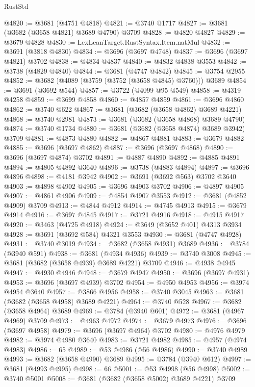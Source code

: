 \begin{lexlean}{RustStd}
\begin{coremodule}
@4820 := @3681 (@4751 @4818)
@4821 := @3740 @1717
@4827 := @3681 (@3682 (@3658 @4821) @3689 @4790) @3709
@4828 := @4820 @4827
@4829 := @3679 @4828
@4830 := LexLeanTarget.RustSyntax.Item.natMul
@4832 := @3691 (@3818 @4830)
@4834 := @3696 (@3697 @4748)
@4837 := @3696 (@3697 @4821) @3702
@4838 := @4834 @4837
@4840 := @4832 @4838 @3553
@4842 := @3738 (@4829 @4840)
@4844 := @3681 (@4747 @4842)
@4845 := @3754 @2955
@4852 := @3682 (@4089 (@3759 (@3752 (@3658 @4845) @3760))) @3689
@4854 := @3691 (@3692 @544)
@4857 := @3722 (@4099 @95 @549)
@4858 := @4319 @4258
@4859 := @3699 @4858
@4860 := @4857 @4859
@4861 := @3696 @4860
@4862 := @3740 @622
@4867 := @3681 (@3682 (@3658 @4862) @3689 @4221)
@4868 := @3740 @2981
@4873 := @3681 (@3682 (@3658 @4868) @3689 @4790)
@4874 := @3740 @1734
@4880 := @3681 (@3682 (@3658 @4874) @3689 @3942) @3709
@4881 := @4873 @4880
@4882 := @4867 @4881
@4883 := @3679 @4882
@4885 := @3696 (@3697 @4862)
@4887 := @3696 (@3697 @4868)
@4890 := @3696 (@3697 @4874) @3702
@4891 := @4887 @4890
@4892 := @4885 @4891
@4894 := @4805 @4892 @3640
@4896 := @3738 (@4883 @4894)
@4897 := @3696 @4896
@4898 := @4181 @3942
@4902 := @3691 (@3692 @563) @3702 @3640
@4903 := @4898 @4902
@4905 := @3696 @4903 @3702
@4906 := @4897 @4905
@4907 := @4861 @4906
@4909 := @4854 @4907 @3553
@4912 := @3681 (@4852 @4909) @3709
@4913 := @4844 @4912
@4914 := @4745 @4913
@4915 := @3679 @4914
@4916 := @3697 @4845
@4917 := @3721 @4916
@4918 := @4915 @4917
@4920 := @3463 (@4725 @4918)
@4924 := @3649 (@3652 @401) @4313 @3934
@4928 := @3691 (@3692 @584) @4321 @3553
@4930 := @3681 (@4747 @4928)
@4931 := @3740 @3019
@4934 := @3682 (@3658 @4931) @3689
@4936 := @3784 (@3940 @591)
@4938 := @3681 (@4934 @4936)
@4939 := @3740 @3008
@4945 := @3681 (@3682 (@3658 @4939) @3689 @4221) @3709
@4946 := @4938 @4945
@4947 := @4930 @4946
@4948 := @3679 @4947
@4950 := @3696 (@3697 @4931)
@4953 := @3696 (@3697 @4939) @3702
@4954 := @4950 @4953
@4956 := @3974 @4954 @3640
@4957 := @3866 @4956
@4958 := @3740 @3045
@4963 := @3681 (@3682 (@3658 @4958) @3689 @4221)
@4964 := @3740 @528
@4967 := @3682 (@3658 @4964) @3689
@4969 := @3784 (@3940 @601)
@4972 := @3681 (@4967 @4969) @3709
@4973 := @4963 @4972
@4974 := @3679 @4973
@4976 := @3696 (@3697 @4958)
@4979 := @3696 (@3697 @4964) @3702
@4980 := @4976 @4979
@4982 := @3974 @4980 @3640
@4983 := @3721 @4982
@4985 := @4957 (@4974 @4983)
@4986 := 65
@4989 := @53 @4986 (@56 @4986)
@4990 := @3740 @4989
@4993 := @3682 (@3658 @4990) @3689
@4995 := @3784 (@3940 @612)
@4997 := @3681 (@4993 @4995)
@4998 := 66
@5001 := @53 @4998 (@56 @4998)
@5002 := @3740 @5001
@5008 := @3681 (@3682 (@3658 @5002) @3689 @4221) @3709

\end{coremodule}
\end{lexlean}

